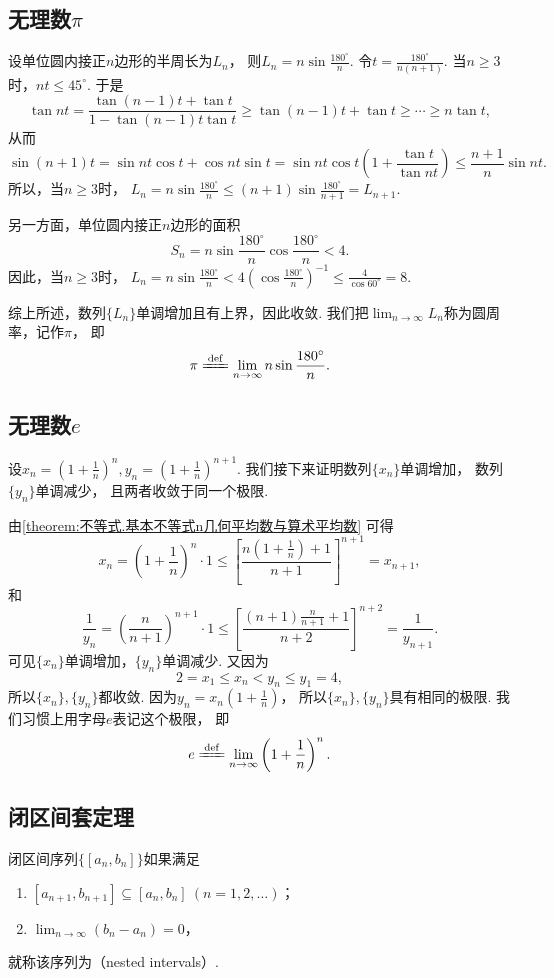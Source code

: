 \subsection{无理数\texorpdfstring{$\pi$}{\textpi}}
设单位圆内接正\(n\)边形的半周长为\(L_n\)，
则\(L_n = n \sin\frac{180^\circ}{n}\).
令\(t=\frac{180^\circ}{n(n+1)}\).
当\(n\geq3\)时，\(nt\leq45^\circ\).
于是\[
	\tan nt
	= \frac{\tan(n-1)t + \tan t}{1 - \tan(n-1)t \tan t}
	\geq \tan(n-1)t + \tan t
	\geq \dotsb \geq n \tan t,
\]
从而\[
	\sin(n+1)t = \sin nt \cos t + \cos nt \sin t
	= \sin nt \cos t \left(1 + \frac{\tan t}{\tan nt}\right)
	\leq \frac{n+1}n \sin nt.
\]
所以，当\(n\geq3\)时，
\(L_n = n \sin\frac{180^\circ}{n}
\leq (n+1) \sin\frac{180^\circ}{n+1} = L_{n+1}\).

另一方面，单位圆内接正\(n\)边形的面积\[
	S_n = n \sin\frac{180^\circ}{n} \cos\frac{180^\circ}{n} < 4.
\]
因此，当\(n\geq3\)时，
\(L_n = n \sin\frac{180^\circ}{n}
< 4 \left(\cos\frac{180^\circ}{n}\right)^{-1}
\leq \frac4{\cos60^\circ}
= 8\).

综上所述，数列\(\{L_n\}\)单调增加且有上界，因此收敛.
我们把\(\lim_{n\to\infty} L_n\)称为圆周率，记作\(\pi\)，
即\[
	\pi \defeq \lim_{n\to\infty} n \sin\frac{180^\circ}{n}.
\]

\subsection{无理数\texorpdfstring{$e$}{e}}
设\(x_n=\left(1+\frac1n\right)^n,
y_n=\left(1+\frac1n\right)^{n+1}\).
我们接下来证明数列\(\{x_n\}\)单调增加，
数列\(\{y_n\}\)单调减少，
且两者收敛于同一个极限.

由\cref{theorem:不等式.基本不等式n几何平均数与算术平均数} 可得\[
	x_n = \left(1+\frac1n\right)^n \cdot 1
	\leq \left[\frac{n\left(1+\frac1n\right)+1}{n+1}\right]^{n+1} = x_{n+1},
\]
和\[
	\frac1{y_n} = \left(\frac{n}{n+1}\right)^{n+1} \cdot 1
	\leq \left[\frac{(n+1)\frac{n}{n+1}+1}{n+2}\right]^{n+2} = \frac1{y_{n+1}}.
\]
可见\(\{x_n\}\)单调增加，\(\{y_n\}\)单调减少.
又因为\[
	2 = x_1 \leq x_n < y_n \leq y_1 = 4,
\]
所以\(\{x_n\},\{y_n\}\)都收敛.
因为\(y_n=x_n\left(1+\frac1n\right)\)，
所以\(\{x_n\},\{y_n\}\)具有相同的极限.
我们习惯上用字母\(e\)表记这个极限，
即\[
	e \defeq \lim_{n\to\infty} \left(1+\frac1n\right)^n.
\]

\subsection{闭区间套定理}
\begin{definition}\label{definition:极限.闭区间套的定义}
闭区间序列\(\{[a_n,b_n]\}\)如果满足
\begin{enumerate}
	\item \([a_{n+1},b_{n+1}] \subseteq [a_n,b_n]\ (n=1,2,\dotsc)\)；
	\item \(\lim_{n\to\infty} (b_n - a_n) = 0\)，
\end{enumerate}
就称该序列为（nested intervals）.
\end{definition}

